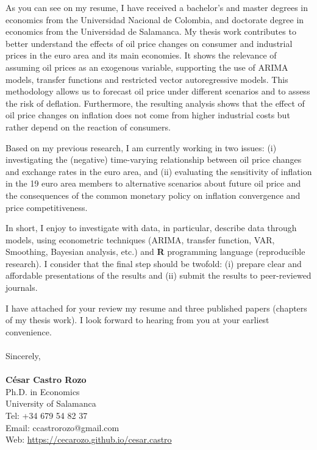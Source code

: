 \documentclass{letter}\usepackage[]{graphicx}\usepackage[]{color}
\begin{document}
{%

As you can see on my resume, I have received a bachelor's and master degrees in economics from the Universidad Nacional de Colombia, and doctorate degree in economics from the Universidad de Salamanca. My thesis work contributes to better understand the effects of oil price changes on consumer and industrial prices in the euro area and its main economies. It shows the relevance of assuming oil prices as an exogenous variable, supporting the use of ARIMA models, transfer functions and restricted vector autoregressive models. This methodology allows us to forecast oil price under different scenarios and to assess the risk of deflation. Furthermore, the resulting analysis shows that the effect of oil price changes on inflation does not come from higher industrial costs but rather depend on the reaction of consumers.

Based on my previous research, I am currently working in two issues: (i) investigating the (negative) time-varying relationship between oil price changes and exchange rates in the euro area, and (ii) evaluating the sensitivity of inflation in the 19 euro area members to alternative scenarios about future oil price and the consequences of the common monetary policy on inflation convergence and price competitiveness.

In short, I enjoy to investigate with data, in particular, describe data through models, using econometric techniques (ARIMA, transfer function, VAR, Smoothing, Bayesian analysis, etc.) and \textbf{\textsf{R}} programming language (reproducible research). I consider that the final step should be twofold: (i) prepare clear and affordable presentations of the results and (ii) submit the results to peer-reviewed journals.

I have attached for your review my resume and three published papers (chapters of my thesis work). I look forward to hearing from you at your earliest convenience.\\
\\
Sincerely,\\
\\
\textbf{César Castro Rozo}\\
Ph.D. in Economics\\
University of Salamanca\\
Tel: +34 679 54 82 37\\
Email: ccastrorozo@gmail.com\\
Web: \href{https://cecarozo.github.io/cesar.castro}{https://cecarozo.github.io/cesar.castro}



}
\end{document}
